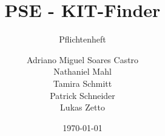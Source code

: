 \title{
    PSE - KIT-Finder
}
\subtitle{Pflichtenheft}
\author{
    Adriano Miguel Soares Castro \\
    Nathaniel Mahl \\
    Tamira Schmitt \\
    Patrick Schneider \\
    Lukas Zetto
}

\date{\today}

\maketitle